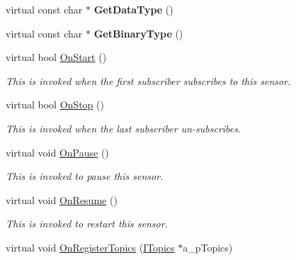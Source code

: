 \begin{DoxyCompactItemize}
virtual const char $\ast$ {\bfseries Get\+Data\+Type} ()
\item 
\mbox{\label{class_proxy_sensor_ae1ebc1d573761159f53b407a27c6cac2}} 
virtual const char $\ast$ {\bfseries Get\+Binary\+Type} ()
\item 
\mbox{\label{class_proxy_sensor_a3f06761583e3bb76765f54043843fe0a}} 
virtual bool \hyperlink{class_proxy_sensor_a3f06761583e3bb76765f54043843fe0a}{On\+Start} ()
\begin{DoxyCompactList}\small\item\em This is invoked when the first subscriber subscribes to this sensor. \end{DoxyCompactList}\item 
\mbox{\label{class_proxy_sensor_a905edd0abdaf9d58e5825dda472ca216}} 
virtual bool \hyperlink{class_proxy_sensor_a905edd0abdaf9d58e5825dda472ca216}{On\+Stop} ()
\begin{DoxyCompactList}\small\item\em This is invoked when the last subscriber un-\/subscribes. \end{DoxyCompactList}\item 
\mbox{\label{class_proxy_sensor_a97712278ffe297b5f8bb03901e9ec760}} 
virtual void \hyperlink{class_proxy_sensor_a97712278ffe297b5f8bb03901e9ec760}{On\+Pause} ()
\begin{DoxyCompactList}\small\item\em This is invoked to pause this sensor. \end{DoxyCompactList}\item 
\mbox{\label{class_proxy_sensor_adbb538d103d807365cc6d341ea673f3f}} 
virtual void \hyperlink{class_proxy_sensor_adbb538d103d807365cc6d341ea673f3f}{On\+Resume} ()
\begin{DoxyCompactList}\small\item\em This is invoked to restart this sensor. \end{DoxyCompactList}\item 
\mbox{\label{class_proxy_sensor_a73ee0b1e69b2f02168f021a307f16c5b}} 
virtual void \hyperlink{class_proxy_sensor_a73ee0b1e69b2f02168f021a307f16c5b}{On\+Register\+Topics} (\hyperlink{class_i_topics}{I\+Topics} $\ast$a\+\_\+p\+Topics)

\end{DoxyCompactItemize}
